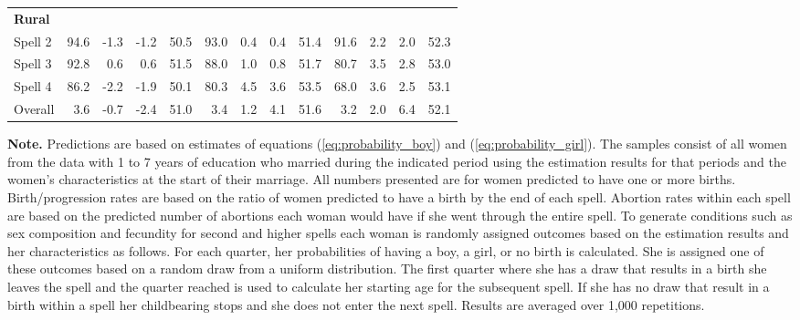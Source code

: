 \documentclass[12pt,letterpaper]{article}
\begin{document}
\begin{table}[htbp]
\begin{center}
\begin{scriptsize}
\begin{threeparttable}
\begin{tabular} {@{} l D{.}{.}{2.1} D{.}{.}{2.1} D{.}{.}{2.1} D{.}{.}{2.1}  D{.}{.}{2.1} D{.}{.}{2.1} D{.}{.}{2.1} D{.}{.}{2.1} D{.}{.}{2.1} D{.}{.}{2.1} D{.}{.}{2.1} D{.}{.}{2.1}  @{}}
\addlinespace 
\bf Rural        &  \\                                                                                  
Spell 2          &       94.6   &  -1.3   &  -1.2   &  50.5   &       93.0   &  0.4    &  0.4    &  51.4   &       91.6   &  2.2    &  2.0    &  52.3   \\
Spell 3          &       92.8   &  0.6    &  0.6    &  51.5   &       88.0   &  1.0    &  0.8    &  51.7   &       80.7   &  3.5    &  2.8    &  53.0   \\
Spell 4          &       86.2   &  -2.2   &  -1.9   &  50.1   &       80.3   &  4.5    &  3.6    &  53.5   &       68.0   &  3.6    &  2.5    &  53.1   \\
Overall &       3.6    &  -0.7   &  -2.4   &  51.0   &       3.4    &  1.2    &  4.1    &  51.6   &       3.2    &  2.0    &  6.4    &  52.1   \\
\bottomrule
\end{tabular}                        
\begin{tablenotes} \tiny
\item \hspace*{-0.5em} \textbf{Note.} Predictions are based on estimates of equations 
(\ref{eq:probability_boy}) and (\ref{eq:probability_girl}).
The samples consist of all women from the data with 1 to 7 years of education who
married during the indicated period using the estimation results for that periods 
and the women's characteristics at the start of their marriage. 
All numbers presented are for women predicted to have one or more births.
Birth/progression rates are based on the ratio of women predicted to have a birth 
by the end of each spell.
Abortion rates within each spell are based on the predicted number of abortions each
woman would have if she went through the entire spell.
To generate conditions such as sex composition and fecundity for second and higher spells 
each woman is randomly assigned outcomes based on the estimation results and
her characteristics as follows.
For each quarter, her probabilities of having a boy, a girl, or no birth is calculated.
She is assigned one of these outcomes based on a random draw from a uniform distribution.
The first quarter where she has a draw that results in a birth she leaves the spell
and the quarter reached is used to calculate her starting age for the subsequent spell.
If she has no draw that result in a birth within a spell her childbearing stops and
she does not enter the next spell.
Results are averaged over 1,000 repetitions.

\end{tablenotes}
\end{threeparttable}
\end{scriptsize}
\end{center}
\end{table}
\end{document}
